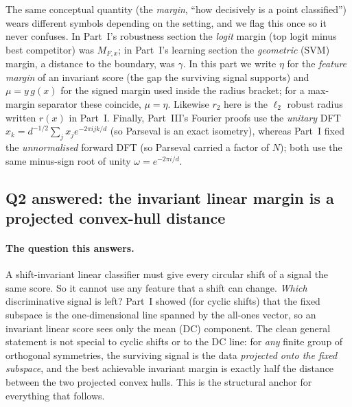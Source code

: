 \begin{remark}
\label{rem:margin-notation}
The same conceptual quantity (the \emph{margin}, ``how decisively is a point classified'')
wears different symbols depending on the setting, and we flag this once so it never confuses.
In Part~I's robustness section the \emph{logit} margin (top logit minus best competitor) was
$M_{F,x}$; in Part~I's learning section the \emph{geometric} (SVM) margin, a distance to the
boundary, was $\gamma$. In this part we write $\eta$ for the \emph{feature margin} of an invariant
score (the gap the surviving signal supports) and $\mu = y\,g(x)$ for the signed margin used inside
the radius bracket; for a max-margin separator these coincide, $\mu = \eta$. Likewise $r_2$ here is
the $\ell_2$ robust radius written $r(x)$ in Part~I. Finally, Part~III's Fourier proofs use the
\emph{unitary} DFT $\hat x_k = d^{-1/2}\sum_j x_j e^{-2\pi i jk/d}$ (so Parseval is an exact isometry),
whereas Part~I fixed the \emph{unnormalised} forward DFT (so Parseval carried a factor of $N$); both
use the same minus-sign root of unity $\omega = e^{-2\pi i/d}$.
\end{remark}


\subsection{Q2 answered: the invariant linear margin is a projected convex-hull distance}
\label{sub:fg-margin}

\paragraph{The question this answers.}
A shift-invariant linear classifier must give every circular shift of a signal the same score. So
it cannot use any feature that a shift can change. \emph{Which} discriminative signal is left? Part~I
showed (for cyclic shifts) that the fixed subspace is the one-dimensional line spanned by the
all-ones vector, so an invariant linear score sees only the mean (DC) component. The clean general
statement is not special to cyclic shifts or to the DC line: for \emph{any} finite group of
orthogonal symmetries, the surviving signal is the data \emph{projected onto the fixed subspace},
and the best achievable invariant margin is exactly half the distance between the two projected
convex hulls. This is the structural anchor for everything that follows.

